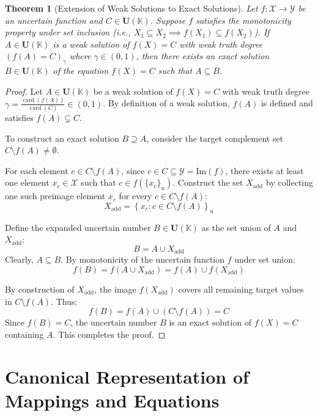 \documentclass[a4paper,12pt, twoside]{memoir}
\newtheorem{theorem}{Theorem}[chapter]
\DeclareMathOperator{\card}{card}
\newcommand{\set}[1]{\left\{#1\right\}} %
\newcommand{\s}[1]{\set{#1}_\mathrm{u}} %
\newcommand{\tsbd}[1]{\mathbf{U}(\mathbb{#1})}
\begin{document}
\begin{theorem}[Extension of Weak Solutions to Exact Solutions]
	Let $f : \mathcal{X} \to \mathcal{Y}$ be an uncertain function and $C \in \tsbd{K}$. Suppose $f$ satisfies the monotonicity property under set inclusion (i.e., $X_1 \subseteq X_2 \implies f(X_1) \subseteq f(X_2)$). If $A \in \tsbd{K}$ is a weak solution of $f(X) = C$ with weak truth degree $(f(A) = C)_\gamma$ where $\gamma \in (0, 1)$, then there exists an exact solution $B \in \tsbd{K}$ of the equation $f(X) = C$ such that $A \subseteq B$.
\end{theorem}

\begin{proof}
	Let $A \in \tsbd{K}$ be a weak solution of $f(X) = C$ with weak truth degree $\gamma = \frac{\card(f(A))}{\card(C)} \in (0, 1)$. By definition of a weak solution, $f(A)$ is defined and satisfies $f(A) \subsetneq C$.

	To construct an exact solution $B \supseteq A$, consider the target complement set $C \setminus f(A) \neq \emptyset$.

	For each element $c \in C \setminus f(A)$, since $c \in C \subseteq \mathcal{Y} = \text{Im}(f)$, there exists at least one element $x_c \in \mathcal{X}$ such that $c \in f(\{x_c\}_u)$. Construct the set $X_{\text{add}}$ by collecting one such preimage element $x_c$ for every $c \in C \setminus f(A)$:
	\[
		X_{\text{add}} = \s{x_c : c \in C \setminus f(A)}
	\]

	Define the expanded uncertain number $B \in \tsbd{K}$ as the set union of $A$ and $X_{\text{add}}$:
	\[
		B = A \cup X_{\text{add}}
	\]
	Clearly, $A \subseteq B$. By monotonicity of the uncertain function $f$ under set union:
	\[
		f(B) = f(A \cup X_{\text{add}}) = f(A) \cup f(X_{\text{add}})
	\]

	By construction of $X_{\text{add}}$, the image $f(X_{\text{add}})$ covers all remaining target values in $C \setminus f(A)$. Thus:
	\[
		f(B) = f(A) \cup (C \setminus f(A)) = C
	\]
	Since $f(B) = C$, the uncertain number $B$ is an exact solution of $f(X) = C$ containing $A$. This completes the proof.
\end{proof}

\section{Canonical Representation of Mappings and Equations}
\end{document}
